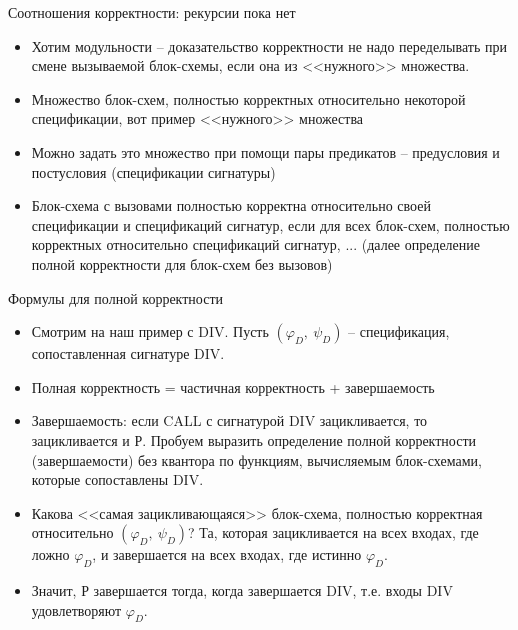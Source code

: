 \documentclass[hyperref={unicode=true}]{beamer}
\begin{document}
    \begin{frame}{Соотношения корректности: рекурсии пока нет}
    \begin{itemize}
    \item Хотим модульности -- доказательство корректности не надо
    переделывать при смене вызываемой блок-схемы, если она из
    <<нужного>> множества.
    \item Множество блок-схем, полностью корректных относительно
          некоторой спецификации, вот пример <<нужного>> множества
    \item Можно задать это множество при помощи пары предикатов --
            предусловия и постусловия (спецификации сигнатуры)
    \item Блок-схема с вызовами полностью корректна относительно
            своей спецификации и спецификаций сигнатур, если
            для всех блок-схем, полностью корректных относительно
            спецификаций сигнатур, ... (далее определение полной
                    корректности для блок-схем без вызовов)
    \end{itemize}
    \end{frame}

    \begin{frame}{Формулы для полной корректности}
    \begin{itemize}
    \item Смотрим на наш пример с DIV. Пусть $(\varphi_D,~\psi_D)$ --
        спецификация, сопоставленная сигнатуре DIV.
    \item Полная корректность = частичная корректность + завершаемость
    \item Завершаемость: если CALL с сигнатурой DIV зацикливается,
                то зацикливается и Р. Пробуем выразить определение
                полной корректности (завершаемости) без квантора по
                функциям, вычисляемым блок-схемами, которые сопоставлены DIV.
    \item Какова <<самая зацикливающаяся>> блок-схема, полностью
            корректная относительно $(\varphi_D,~\psi_D)$? Та, которая
            зацикливается на всех входах, где ложно $\varphi_D$, и
            завершается на всех входах, где истинно $\varphi_D$.
    \item Значит, Р завершается тогда, когда завершается DIV, т.е.
            входы DIV удовлетворяют $\varphi_D$.
    \end{itemize}
    \end{frame}
\end{document}
